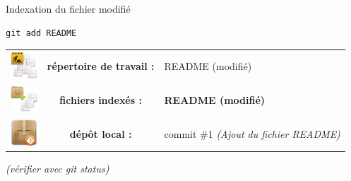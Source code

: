 \documentclass{beamer}
\begin{document}
\begin{frame}[fragile]{Indexation du fichier modifié}
	\begin{lstlisting}[frame=single]
		git add README
	\end{lstlisting}
	
	\begin{center}
		\begin{tabular}{l c l}
		\includegraphics[width=1cm]{img/working_dir} & \textbf{répertoire de travail :} & README (modifié)\\
		\includegraphics[width=1cm]{img/stash} & \textbf{fichiers indexés :} & \textbf{README (modifié)}\\
		\includegraphics[width=1cm]{img/git_repo} & \textbf{dépôt local :} & commit \#1 {\tiny\textit{(Ajout du fichier README)}} \\ 
		\end{tabular} 
	\end{center}

	\begin{center}
		\textit{(vérifier avec git status)}
	\end{center}
\end{frame}
\end{document}

